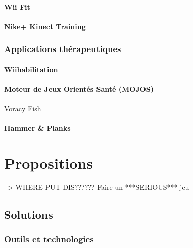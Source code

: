 \documentclass[french,12pt]{report}
\begin{document}
  \subsubsection{Wii Fit}
  \subsubsection{Nike+ Kinect Training}
  
  
  \subsection{Applications thérapeutiques}
  
  \subsubsection{Wiihabilitation}

  \subsubsection{Moteur de Jeux Orientés Santé (MOJOS)}
  Voracy Fish
  
  \subsubsection{Hammer \& Planks}
  

	
	
	\chapter{Propositions}
	
	
	
		--> WHERE PUT DIS?????? Faire un ***SERIOUS*** jeu
		
		
		
		\section{Solutions}
		
		\subsection{Outils et technologies} 		%
		
\end{document}
